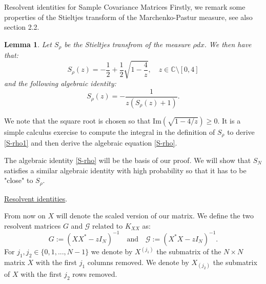 \documentclass[11pt, a4paper, oneside]{book}
\numberwithin{equation}{chapter}
\newcommand{\beq}{\begin{equation}}
\newcommand{\eeq}{\end{equation}}
\newtheorem{lem}[thm]{Lemma}
\begin{document}
\begin{section}{Resolvent identities for Sample Covariance Matrices}
Firstly, we remark some properties of the Stieltjes transform of the Marchenko-Pastur measure, see also \cite{cacciapuoti2013local} section 2.2.

\begin{lem}
Let $S_\rho$ be the Stieltjes transfrom of the measure $\rho dx.$ We then have that:
\beq \label{S-rho1}
S_{\rho}(z) = -\frac{1}{2} + \frac{1}{2} \sqrt{1 - \frac{4}{z}}, \quad z \in \mathbb{C}\setminus [0,4]
\eeq
and the following algebraic identity:
\beq \label{S-rho}
S_{\rho}(z) = - \frac{1}{z(S_\rho(z)+1)} .
\eeq
\end{lem}
%
We note that the square root is chosen so that $\mathrm{Im} \left ( \sqrt{1- 4/z} \right ) \geq 0.$ It is a simple calculus exercise to compute the integral in the definition of $S_\rho$ to derive \eqref{S-rho1} and then derive the algebraic equation \eqref{S-rho}.

The algebraic identity \eqref{S-rho} will be the basis of our proof. We will show that $S_{N}$ satisfies a similar algebraic identity with high probability so that it has to be "close" to $S_{\rho}.$

\underline{Resolvent identities}.

From now on $X$ will denote the scaled version of our matrix. We define the two resolvent matrices $G$ and $\mathcal{G}$ related to $K_{XX}$ as:
%
\beq \label{res0}
G := (X X^* - zI_N)^{-1} \quad \textrm{and} \quad \mathcal{G} := (X^*X - zI_N)^{-1}.
\eeq
%
For $j_1,j_2 \in \{0,1,...,N-1 \}$ we denote by $X^{(j_1)}$ the submatrix of the $N \times N$ matrix $X$ with the first $j_1$ columns removed. We denote by $X_{(j_2)}$ the submatrix of $X$ with the first $j_2$ rows removed.


\end{section}
\end{document}
